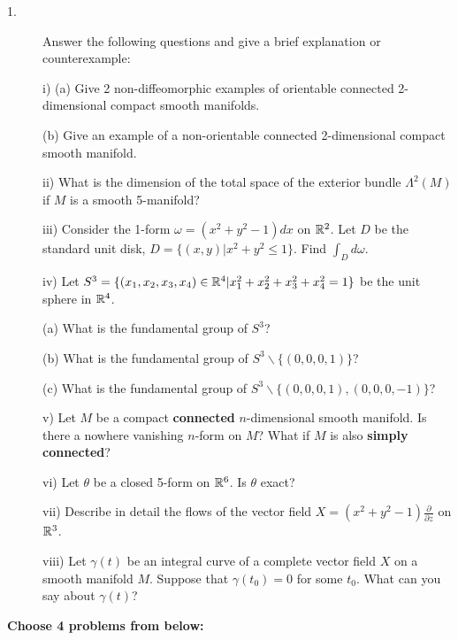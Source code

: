 \documentclass{article}
\begin{document}
\begin{description}

\item[1.]
Answer the following questions and give a brief explanation or
counterexample:

\item[\quad] i) \quad (a)
Give 2 non-diffeomorphic examples of orientable connected 2-dimensional
compact smooth manifolds.

\item[\quad] \quad (b)
Give an example of a non-orientable connected 2-dimensional compact
smooth manifold.

\item[\quad] ii)
What is the dimension of the total space of the exterior bundle
$\Lambda^2 (M)$ if $M$ is a smooth 5-manifold?

\item[\quad] iii)
Consider the 1-form $\omega = (x^2 + y^2 - 1) dx$ on $\Bbb R^2$. Let $D$ be
the standard unit disk, $D= \{(x,y) |x^2+y^2 \leq 1 \}$. Find
$\int_D d \omega$.

\item[\quad] iv)
Let $S^3 = \{(x_1, x_2, x_3, x_4) \in \Bbb R^4 |
    x^2_1 + x^2_2+ x^2_3 + x^2_4 = 1\}$
be the unit sphere in $\Bbb R^4$.

\item[\quad] \quad (a)
What is the fundamental group of $S^3$?

\item[\quad] \quad (b)
What is the fundamental group of $S^3 \backslash \{(0,0,0,1)\}$?

\item[\quad] \quad (c)
What is the fundamental group of
$S^3 \backslash \{(0,0,0,1), (0,0,0,-1) \}$?

\item[\quad] v)
Let $M$ be a compact {\bf connected} $n$-dimensional smooth manifold.
Is there a nowhere vanishing $n$-form on $M$? What if $M$ is also
{\bf simply connected}?

\item[\quad] vi)
Let $\theta$ be a closed 5-form on $\Bbb R^6$. Is $\theta$ exact?

\item[\quad] vii)
Describe in detail the flows of the vector field
$X=(x^2+y^2-1) \frac{\partial}{\partial z}$ on $\Bbb R^3$.

\item[\quad] viii)
Let $\gamma (t)$ be an integral curve of a complete vector field $X$ on a
smooth manifold $M$. Suppose that $\gamma(t_0)=0$ for some $t_0$. What
can you say about $\gamma (t)$?

\end{description}
{\bf Choose 4 problems from below:}
\end{document}
